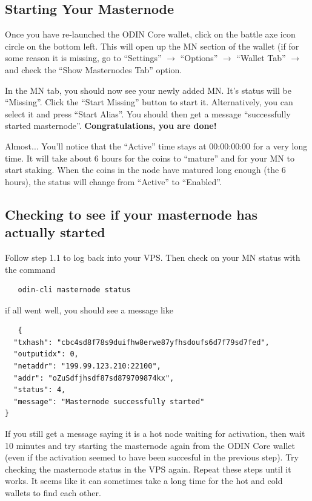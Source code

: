 \documentclass[rmp,12pt,notitlepage]{revtex4-1}
\begin{document}
\subsection{Starting Your Masternode}
Once you have re-launched the ODIN Core wallet, click on the battle axe icon circle on the bottom left.  This will open up the MN section of the wallet (if for some reason it is missing, go to ``Settings'' $\rightarrow$ ``Options'' $\rightarrow$ ``Wallet Tab'' $\rightarrow$ and check the ``Show Masternodes Tab'' option.  

In the MN tab, you should now see your newly added MN.  It's status will be ``Missing''.  Click the ``Start Missing'' button to start it.  Alternatively, you can select it and press ``Start Alias''.  You should then get a message ``successfully started masternode''.  \textbf{Congratulations, you are done!}  

Almost...
You'll notice that the ``Active'' time stays at 00:00:00:00 for a very long time.  It will take about 6 hours for the coins to ``mature'' and for your MN to start staking.  When the coins in the node have matured long enough (the 6 hours), the status will change from ``Active'' to ``Enabled''.

\subsection{Checking to see if your masternode has actually started}
Follow step 1.1 to log back into your VPS.  Then check on your MN status with the command
\begin{verbatim}
   odin-cli masternode status
\end{verbatim}
if all went well, you should see a message like
\begin{verbatim}
   {
  "txhash": "cbc4sd8f78s9duifhw8erwe87yfhsdoufs6d7f79sd7fed",
  "outputidx": 0,
  "netaddr": "199.99.123.210:22100",
  "addr": "oZuSdfjhsdf87sd879709874kx",
  "status": 4,
  "message": "Masternode successfully started"
}
\end{verbatim}
If you still get a message saying it is a hot node waiting for activation, then wait 10 minutes and try starting the masternode again from the ODIN Core wallet (even if the activation seemed to have been succesful in the previous step).  Try checking the masternode status in the VPS again.  Repeat these steps until it works.  It seems like it can sometimes take a long time for the hot and cold wallets to find each other.  
\end{document}
